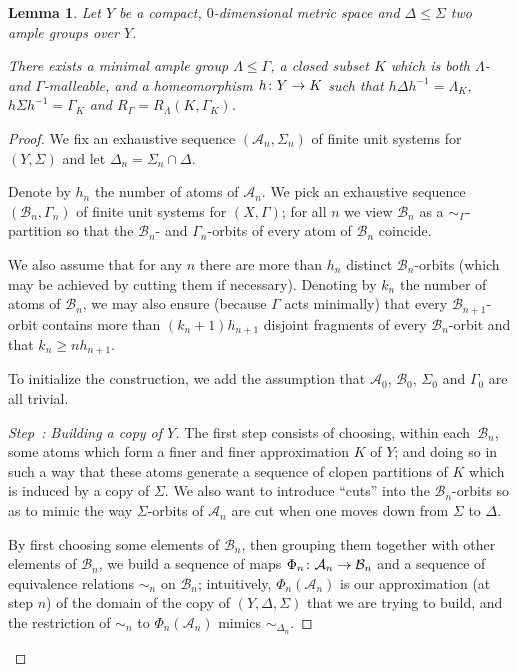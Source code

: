 \documentclass[10pt,a4paper]{article}
\newtheorem{lemm}[theo]{Lemma}
\theoremstyle{definition}
\newcommand{\mcA}{\mathcal{A}}
\newcommand{\mcB}{\mathcal{B}}
\newcounter{setofstep}
\newcounter{step}[setofstep]
\newenvironment{step}[1][]{\refstepcounter{step}\begin{proof}[{Step~\thestep\if#1\empty\else: #1\fi}]}{\let\qed\relax\end{proof}}
\renewcommand*{\to}{\mathchoice{\longrightarrow}{\rightarrow}{\rightarrow}{\rightarrow}}
\begin{document}
\begin{lemm}\label{l:everyone_is_a_small_extension}
Let $Y$ be a compact, $0$-dimensional metric space and $\Delta \le \Sigma$ two ample groups over $Y$.

There exists a minimal ample group $\Lambda \le \Gamma$, a closed subset $K$ which is both $\Lambda$- and $\Gamma$-malleable, and a homeomorphism $h \colon Y \to K$ such that $h \Delta h^{-1} = \Lambda_K$, $h \Sigma h^{-1} = \Gamma_K $ and $R_\Gamma=R_\Lambda(K,\Gamma_K)$.
\end{lemm}

\begin{proof}
We fix an exhaustive sequence $(\mcA_n,\Sigma_n)$ of finite unit systems for $(Y,\Sigma)$ and let $\Delta_n=\Sigma_n \cap \Delta$.

Denote by $h_n$ the number of atoms of $\mcA_n$. We pick an exhaustive sequence $(\mcB_n,\Gamma_n)$ of finite unit systems for $(X,\Gamma)$; for all $n$ we view $\mcB_n$ as a $\sim_\Gamma$-partition so that the $\mcB_n$- and $\Gamma_n$-orbits of every atom of $\mcB_n$ coincide.

We also assume that for any $n$ there are more than $h_n$ distinct $\mcB_n$-orbits (which may be achieved by cutting them if necessary). Denoting by $k_n$ the number of atoms of $\mcB_n$, we may also ensure (because $\Gamma$ acts minimally) that every $\mcB_{n+1}$-orbit contains more than $(k_n+1)h_{n+1}$ disjoint fragments of every $\mcB_n$-orbit and that $k_{n} \ge n h_{n+1}$.

To initialize the construction, we add the assumption that $\mcA_0$, $\mcB_0$, $\Sigma_0$ and $\Gamma_0$ are all trivial.


\begin{step}[{Building a copy of $Y$}]\label{step1}
The first step consists of choosing, within each~$\mcB_n$, some atoms which form a finer and finer approximation $K$ of $Y$; and doing so in such a way that these atoms generate a sequence of clopen partitions of $K$ which is induced by a copy of $\Sigma$. We also want to introduce ``cuts'' into the $\mcB_n$-orbits so as to mimic the way $\Sigma$-orbits of $\mcA_n$ are cut when one moves down from $\Sigma$ to $\Delta$.


By first choosing some elements of $\mcB_n$, then grouping them together with other elements of $\mcB_n$, we build a sequence of maps $\Phi_n \colon \mcA_n \to \mcB_n$ and a sequence of equivalence relations $\sim_n$ on $\mcB_n$; intuitively, $\Phi_n(\mcA_n)$ is our approximation (at step $n$) of the domain of the copy of $(Y,\Delta,\Sigma)$ that we are trying to build, and the restriction of $\sim_n$ to $\Phi_n(\mcA_n)$ mimics $\sim_{\Delta_n}$.


\end{step}
\end{proof}
\end{document}
